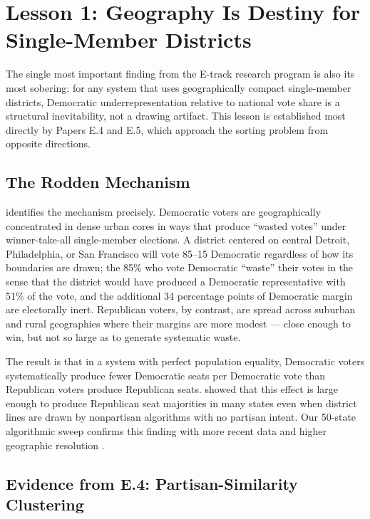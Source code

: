 \section{Lesson 1: Geography Is Destiny for Single-Member Districts}
\label{sec:lesson1}

The single most important finding from the E-track research program is also
its most sobering: for any system that uses geographically compact single-member
districts, Democratic underrepresentation relative to national vote share is a
structural inevitability, not a drawing artifact.  This lesson is established
most directly by Papers E.4 and E.5, which approach the sorting problem from
opposite directions.

\subsection{The Rodden Mechanism}

\citet{rodden2019why} identifies the mechanism precisely.  Democratic voters
are geographically concentrated in dense urban cores in ways that produce
``wasted votes'' under winner-take-all single-member elections.  A district
centered on central Detroit, Philadelphia, or San Francisco will vote 85--15
Democratic regardless of how its boundaries are drawn; the 85\% who vote
Democratic ``waste'' their votes in the sense that the district would have
produced a Democratic representative with 51\% of the vote, and the additional
34 percentage points of Democratic margin are electorally inert.  Republican
voters, by contrast, are spread across suburban and rural geographies where
their margins are more modest --- close enough to win, but not so large as
to generate systematic waste.

The result is that in a system with perfect population equality, Democratic
voters systematically produce fewer Democratic seats per Democratic vote than
Republican voters produce Republican seats.  \citet{chen2013unintentional}
showed that this effect is large enough to produce Republican seat majorities
in many states even when district lines are drawn by nonpartisan algorithms
with no partisan intent.  Our 50-state algorithmic sweep confirms this finding
with more recent data and higher geographic resolution \citep{dellaLibera2026mec}.

\subsection{Evidence from E.4: Partisan-Similarity Clustering}

